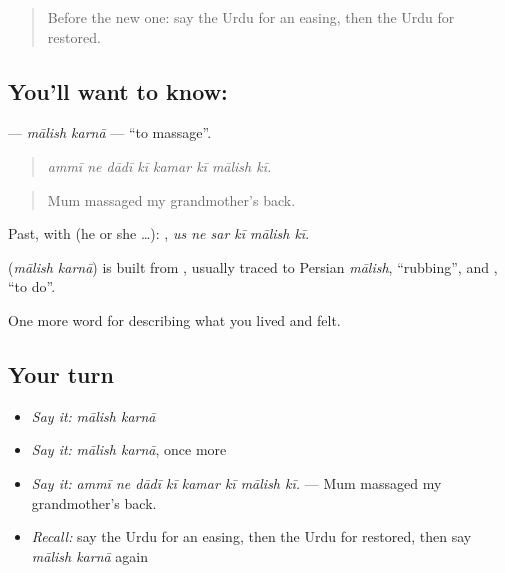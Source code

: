 \begin{quote}
Before the new one: say the Urdu for an easing, then the Urdu for restored.
\end{quote}

\subsection*{You'll want to know:  }
\textbf{ } — \emph{mālish karnā} — \textquotedblleft{}to massage\textquotedblright{}.

\begin{quote}
       
\end{quote}

\begin{quote}
\emph{ammī ne dādī kī kamar kī mālish kī.}
\end{quote}

\begin{quote}
Mum massaged my grandmother's back.
\end{quote}

Past, with  (he or she …):      , \emph{us ne sar kī mālish kī}.

\begin{cousinweb}
\textbf{ } (\emph{mālish karnā}) is built from \textbf{}, usually traced to Persian \emph{mālish}, \textquotedblleft{}rubbing\textquotedblright{}, and \textbf{}, \textquotedblleft{}to do\textquotedblright{}.
\end{cousinweb}

\begin{grammarlens}[title={What you've built}]
One more word for describing what you lived and felt.
\end{grammarlens}

\subsection*{Your turn}
\begin{itemize}
\raggedright
  \item \emph{Say it:} \emph{mālish karnā}
  \item \emph{Say it:} \emph{mālish karnā}, once more
  \item \emph{Say it:} \emph{ammī ne dādī kī kamar kī mālish kī.} — Mum massaged my grandmother's back.
  \item \emph{Recall:} say the Urdu for an easing, then the Urdu for restored, then say \emph{mālish karnā} again
\end{itemize}

